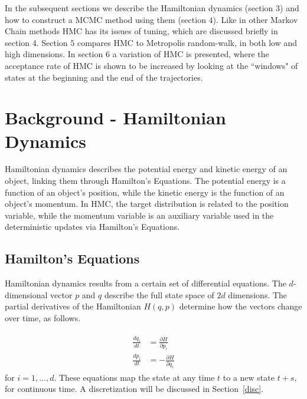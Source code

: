 \documentclass{article}
\numberwithin{equation}{section}
\begin{document}
In the subsequent sections we describe the Hamiltonian dynamics (section $3$) and how to construct a MCMC method using them (section $4$). Like in other Markov Chain methods HMC has its issues of tuning, which are discussed briefly in section $4$. Section $5$ compares HMC to Metropolis random-walk, in both low and high dimensions. In section $6$ a variation of HMC is presented, where the acceptance rate of HMC is shown to be increased by looking at the ``windows" of states at the beginning and the end of the trajectories.


\section{Background - Hamiltonian Dynamics}
Hamiltonian dynamics describes the potential energy and kinetic energy of an object, linking them through Hamilton's Equations. The potential energy is a function of an object's position, while the kinetic energy is the function of an object's momentum. In HMC, the target distribution is related to the position variable, while the momentum variable is an auxiliary variable used in the deterministic updates via Hamilton's Equations.

\subsection{Hamilton's Equations}
Hamiltonian dynamics results from a certain set of differential equations. The $d$-dimensional vector $p$ and $q$ describe the full state space of $2d$ dimensions. The partial derivatives of the Hamiltonian $H(q,p)$ determine how the vectors change over time, as follows.

\begin{align}
\begin{split}
\frac{dq_i}{dt} &= \frac{\partial H}{\partial p_i}\\
\frac{dp_i}{dt} &= -\frac{\partial H}{\partial q_i}
\end{split}
\label{eq:3.1}
\end{align}
for $i = 1,...,d$. These equations map the state at any time $t$ to a new state $t+s$, for continuous time. A discretization will be discussed in Section~\ref{disc}.
\end{document}
